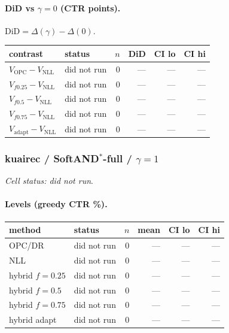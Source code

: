 \documentclass[10pt,a4paper]{article}
\begin{document}
\paragraph{DiD vs $\gamma=0$ (CTR points).} $\mathrm{DiD}=\Delta(\gamma)-\Delta(0)$.
{\centering\small\begin{tabular}{llrrrr}
\toprule contrast & status & $n$ & DiD & CI lo & CI hi \\
\midrule
$V_{\mathrm{OPC}}-V_{\mathrm{NLL}}$ & did not run & 0 & --- & --- & --- \\
$V_{f0.25}-V_{\mathrm{NLL}}$ & did not run & 0 & --- & --- & --- \\
$V_{f0.5}-V_{\mathrm{NLL}}$ & did not run & 0 & --- & --- & --- \\
$V_{f0.75}-V_{\mathrm{NLL}}$ & did not run & 0 & --- & --- & --- \\
$V_{\mathrm{adapt}}-V_{\mathrm{NLL}}$ & did not run & 0 & --- & --- & --- \\
\bottomrule\end{tabular}\par}
\bigskip
\subsubsection{kuairec / SoftAND$^*$-full / $\gamma=1$}
\emph{Cell status: did not run}.
\paragraph{Levels (greedy CTR \%).}
{\centering\small\begin{tabular}{llrrrr}
\toprule method & status & $n$ & mean & CI lo & CI hi \\
\midrule
OPC/DR & did not run & 0 & --- & --- & --- \\
NLL & did not run & 0 & --- & --- & --- \\
hybrid $f{=}0.25$ & did not run & 0 & --- & --- & --- \\
hybrid $f{=}0.5$ & did not run & 0 & --- & --- & --- \\
hybrid $f{=}0.75$ & did not run & 0 & --- & --- & --- \\
hybrid adapt & did not run & 0 & --- & --- & --- \\
\bottomrule\end{tabular}\par}
\end{document}
